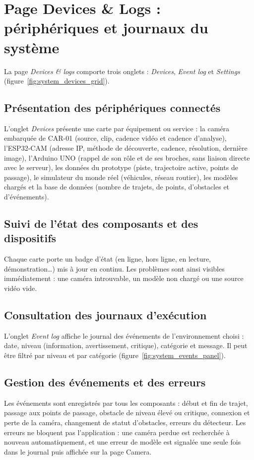 \section{Page Devices \& Logs : périphériques et journaux du système}

La page \emph{Devices \& logs} comporte trois onglets : \emph{Devices}, \emph{Event log} et \emph{Settings}
(figure~\ref{fig:system_devices_grid}).


\subsection{Présentation des périphériques connectés}
L'onglet \emph{Devices} présente une carte par équipement ou service : la caméra embarquée de CAR-01 (source, clip,
cadence vidéo et cadence d'analyse), l'ESP32-CAM (adresse IP, méthode de découverte, cadence, résolution, dernière
image), l'Arduino UNO (rappel de son rôle et de ses broches, sans liaison directe avec le serveur), les données du
prototype (piste, trajectoire active, points de passage), le simulateur du monde réel (véhicules, réseau routier), les
modèles chargés et la base de données (nombre de trajets, de points, d'obstacles et d'événements).

\subsection{Suivi de l'état des composants et des dispositifs}
Chaque carte porte un badge d'état (en ligne, hors ligne, en lecture, démonstration…) mis à jour en continu. Les
problèmes sont ainsi visibles immédiatement : une caméra introuvable, un modèle non chargé ou une source vidéo vide.

\subsection{Consultation des journaux d'exécution}
L'onglet \emph{Event log} affiche le journal des événements de l'environnement choisi : date, niveau (information,
avertissement, critique), catégorie et message. Il peut être filtré par niveau et par catégorie
(figure~\ref{fig:system_events_panel}).


\subsection{Gestion des événements et des erreurs}
Les événements sont enregistrés par tous les composants : début et fin de trajet, passage aux points de passage,
obstacle de niveau élevé ou critique, connexion et perte de la caméra, changement de statut d'obstacles, erreurs du
détecteur. Les erreurs ne bloquent pas l'application : une caméra perdue est recherchée à nouveau automatiquement, et
une erreur de modèle est signalée une seule fois dans le journal puis affichée sur la page Camera.

